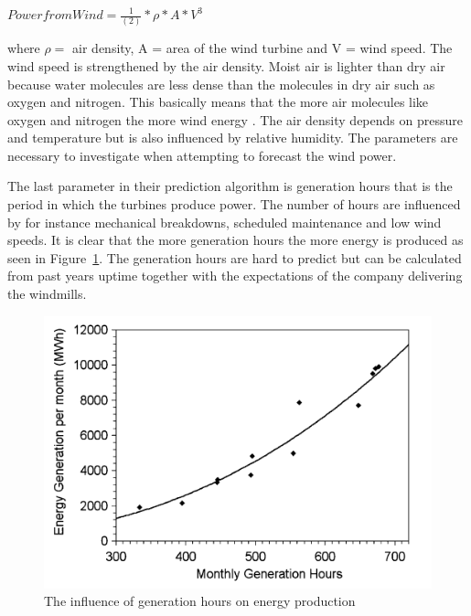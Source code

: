 \begin{center}
$Power from Wind=\frac{1}{(2)}*\rho*A*V^3$
\end{center}

\noindent where $\rho = $ air density, A = area of the wind turbine and V = wind speed.
\newline
\noindent The wind speed is strengthened by the air density. Moist air is lighter than dry air because water molecules are less dense than the molecules in dry air such as oxygen and nitrogen. This basically means that the more air molecules like oxygen and nitrogen the more wind energy \cite{AirDensityInForecast}.
The air density depends on pressure and temperature but is also influenced by relative humidity. The parameters are necessary to investigate when attempting to forecast the wind power.

The last parameter in their prediction algorithm is generation hours that is the period in which the turbines produce power. The number of hours are influenced by for instance mechanical breakdowns, scheduled maintenance and low wind speeds. It is clear that the more generation hours the more energy is produced as seen in Figure~\ref{fig:energyGenerationFromHours}. The generation hours are hard to predict but can be calculated from past years uptime together with the expectations of the company delivering the windmills.  

\begin{figure}[h!]
\centering
\includegraphics[width=0.8\linewidth,natwidth=898,natheight=587]{billeder/GenerationHourVSGeneration.png}
\caption{The influence of generation hours on energy production \cite{WindPowerGenerationUsingANN}}
\label{fig:energyGenerationFromHours}
\end{figure} 

